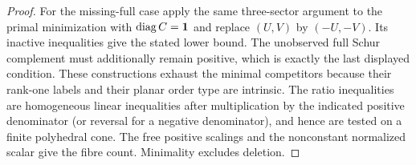 \begin{proof}
For the missing-full case apply the same three-sector argument to the
primal minimization with $\operatorname{diag} C=\mathbf1$ and replace $(U,V)$ by
$(-U,-V)$. Its inactive inequalities give the stated lower bound. The
unobserved full Schur complement must additionally remain positive, which
is exactly the last displayed condition. These constructions exhaust the
minimal competitors because their rank-one labels and their planar order
type are intrinsic. The ratio inequalities are homogeneous linear
inequalities after multiplication by the indicated positive denominator
(or reversal for a negative denominator), and hence are tested on a
finite polyhedral cone. The free positive scalings and the nonconstant
normalized scalar give the fibre count. Minimality excludes deletion.
\end{proof}

